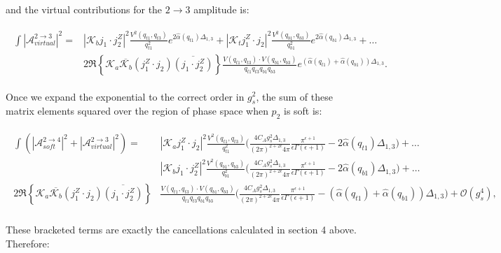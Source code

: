 	and the virtual contributions for the $2\rightarrow3$ amplitude is:

	\begin{align}
	\begin{split}
		\int|\mathcal{A}^{2\rightarrow3}_{virtual}|^2 = &|\mathcal{K}_bj_1\cdot j_2^Z|^2
		\frac{V^2(q_{t1}, q_{t3})}{q_{t1}^2}e^{2\hat{\alpha}(q_{t1})\Delta_{1,3}} +
		|\mathcal{K}_tj_1^Z\cdot j_2|^2 \frac{V^2(q_{b1}, q_{b3})}{q_{b1}^2}e^{2\hat{\alpha}(q_{b1})\Delta_{1,3}} + \ldots \\
		& 2\Re\left\{\mathcal{K}_a\overline{\mathcal{K}_b}  (j_1^Z\cdot j_2)\overline{(j_1\cdot j_2^Z)}\right\}
		\frac{V(q_{t1}, q_{t3})\cdot V(q_{b1}, q_{b3})}{q_{t1}q_{t3}q_{b1}q_{b3}}e^{(\hat{\alpha}(q_{t1}) +
		\hat{\alpha}(q_{b1}))\Delta_{1,3}}.
	\end{split}
	\end{align}

	Once we expand the exponential to the correct order in $g_s^2$, the sum of these
	matrix elements squared over the region of phase space when $p_2$ is soft is:

	\begin{align}
	\begin{split}
		\int\left(|\mathcal{A}^{2\rightarrow4}_{soft}|^2 + |\mathcal{A}^{2\rightarrow3}_{virtual}|^2\right) =
		&|\mathcal{K}_aj_1^Z\cdot j_2|^2 \frac{V^2(q_{t1}, q_{t3})}{q_{t1}^2}
		{\Bigg(\frac{4C_Ag_s^2\Delta_{1,3}}{(2\pi)^{2+2\epsilon}4\pi}\frac{\pi^{\epsilon+1}}
		{\epsilon\Gamma(\epsilon+1)} - 2\hat{\alpha}(q_{t1})\Delta_{1,3}\Bigg)}+\ldots \\
		& |\mathcal{K}_bj_1\cdot j_2^Z|^2 \frac{V^2(q_{b1}, q_{b3})}{q_{b1}^2}
		{\Bigg(\frac{4C_Ag_s^2\Delta_{1,3}}{(2\pi)^{2+2\epsilon}4\pi}\frac{\pi^{\epsilon+1}}
		{\epsilon\Gamma(\epsilon+1)} - 2\hat{\alpha}(q_{b1})\Delta_{1,3}\Bigg)}+\ldots \\
		2\Re\left\{\mathcal{K}_a\overline{\mathcal{K}_b}  (j_1^Z\cdot j_2)\overline{(j_1\cdot j_2^Z)}\right\}&
		\frac{V(q_{t1}, q_{t3})\cdot V(q_{b1}, q_{b3})}{q_{t1}q_{t3}q_{b1}q_{b3}}{\Bigg(\frac{4C_Ag_s^2\Delta_{1,3}}
		{(2\pi)^{2+2\epsilon}4\pi}\frac{\pi^{\epsilon+1}}{\epsilon\Gamma(\epsilon+1)} -
		(\hat{\alpha}(q_{t1}) + \hat{\alpha}(q_{b1}))\Delta_{1,3}\Bigg)} + \mathcal{O}(g_s^4),\\
	\end{split}
	\end{align}

	These bracketed terms are exactly the cancellations calculated in section 4 above.  Therefore:

